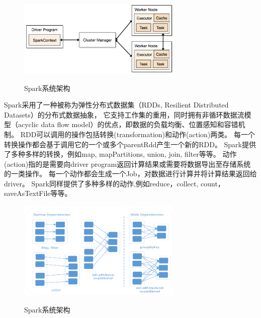 \documentclass[master]{njuthesis}
\begin{document}
\begin{figure}[h]
  \centering
  \includegraphics[width= 0.7\textwidth]{figure/spark_components.png}\\
  \caption{Spark系统架构}
  \label{fig:spark_components}
\end{figure}
Spark采用了一种被称为弹性分布式数据集\cite{DBLP:conf/nsdi/ZahariaCDDMMFSS12}（RDDs, Resilient Distributed Datasets）的分布式数据抽象，
它支持工作集的重用，同时拥有非循环数据流模型（acyclic data flow model）的优点，即数据的负载均衡、位置感知和容错机制。
RDD可以调用的操作包括转换(transformation)和动作(action)两类。
每一个转换操作都会基于调用它的一个或多个parentRdd产生一个新的RDD。
Spark提供了多种多样的转换，例如map, mapPartitions, union, join, filter等等。
动作(action)指的是需要向driver program返回计算结果或需要将数据导出至存储系统的一类操作。
每一个动作都会生成一个Job，对数据进行计算并将计算结果返回给driver。
Spark同样提供了多种多样的动作,例如reduce，collect, count， saveAsTextFile等等。
\iffalse
\begin{figure}[htbp]
  \centering
  \includegraphics[width= 0.7\textwidth]{figure/rdd_dependency.png}\\
  \caption{Spark系统架构}
  \label{fig:rdd_dependency}
\end{figure}
\end{document}
